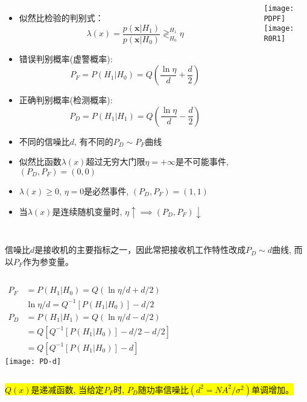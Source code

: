\begin{frame}[shrink]
\begin{columns}
	\small
    \begin{itemize}
    	\item 似然比检验的判别式：
    	\[\lambda(x)=\frac{p(\bm{x}|H_1)}{p(\bm{x}|H_0)}\mathop{\gtrless}_{H_0}^{H_1}\eta \]
    	\item 错误判别概率(虚警概率):
    	\[P_F=P(H_1|H_0)=Q\left(\frac{\ln\eta}{d}+\frac{d}{2}\right)\]
    	\item 正确判别概率(检测概率):
    	\[P_D=P(H_1|H_1)=Q\left(\frac{\ln\eta}{d}-\frac{d}{2}\right)\]
    	\item 不同的信噪比$d$, 有不同的$P_D\sim P_F$曲线
    	\item 似然比函数$\lambda(x)$超过无穷大门限$\eta=+\infty$是不可能事件, $(P_D,P_F)=(0,0)$
    	\item $\lambda(x)\ge 0$, $\eta=0$是必然事件, $(P_D,P_F)=(1,1)$
    	\item 当$\lambda(x)$是连续随机变量时, $\eta\uparrow\implies (P_D,P_F)\downarrow$
    \end{itemize}
	\texttt{[image: PDPF]}\\
	\texttt{[image: R0R1]}
\end{columns}
\end{frame}

\begin{frame}[shrink]
信噪比$d$是接收机的主要指标之一，因此常把接收机工作特性改成$P_D\sim d$曲线, 而以$P_F$作为参变量。
\begin{columns}
	\begin{align*}
	P_F&=P(H_1|H_0)=Q(\ln\eta/d+d/2)\\ 
	&\ln\eta/d=Q^{-1}[P(H_1|H_0)]-d/2\\
	P_D&=P(H_1|H_1)=Q\left(\ln\eta/d-d/2\right)\\
	&=Q[Q^{-1}[P(H_1|H_0)]-d/2-d/2]\\
	&=Q[Q^{-1}[P(H_1|H_0)]-d]
	\end{align*}
	\texttt{[image: PD-d]}
\end{columns}

\medskip

\colorbox{yellow}{$Q(x)$是递减函数, 当给定$P_F$时, $P_D$随功率信噪比$(d^2=NA^2/\sigma^2)$单调增加。} 
\end{frame}

